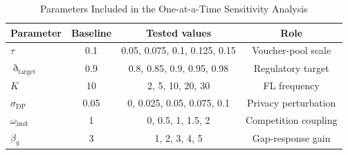 \begin{table}[t]
\centering
\caption{Parameters Included in the One-at-a-Time Sensitivity Analysis}
\label{tab:sensitivity_ranges}
\footnotesize
\renewcommand{\arraystretch}{1.08}
\begin{tabular}{lccc}
\toprule
Parameter & Baseline & Tested values & Role \\
\midrule
$\tau$ & 0.1 & 0.05, 0.075, 0.1, 0.125, 0.15 & Voucher-pool scale \\
$\eth_{\mathrm{target}}$ & 0.9 & 0.8, 0.85, 0.9, 0.95, 0.98 & Regulatory target \\
$K$ & 10 & 2, 5, 10, 20, 30 & FL frequency \\
$\sigma_{\mathrm{DP}}$ & 0.05 & 0, 0.025, 0.05, 0.075, 0.1 & Privacy perturbation \\
$\omega_{\mathrm{imit}}$ & 1 & 0, 0.5, 1, 1.5, 2 & Competition coupling \\
$\beta_g$ & 3 & 1, 2, 3, 4, 5 & Gap-response gain \\
\bottomrule
\end{tabular}
\end{table}
